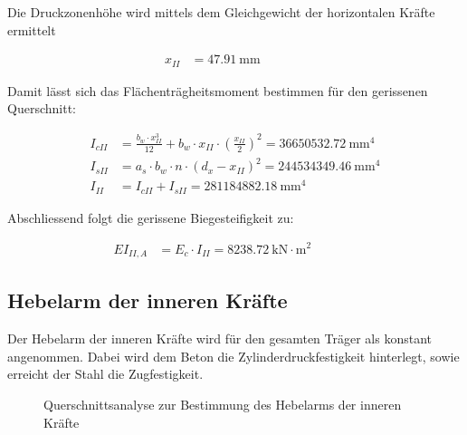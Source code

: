 \documentclass[
  11pt,
  letterpaper,
]{scrreprt}
\begin{document}
Die Druckzonenhöhe wird mittels dem Gleichgewicht der horizontalen
Kräfte ermittelt

\[
\begin{aligned}
x_{II}& = 47.91 \ \mathrm{mm} \quad &  \quad &  
 \end{aligned}
\]

Damit lässt sich das Flächenträgheitsmoment bestimmen für den gerissenen
Querschnitt:

\[
\begin{aligned}
I_{cII}& = \frac{b_{w} \cdot x_{II}^{3}}{12} + b_{w} \cdot x_{II} \cdot \left(\frac{x_{II}}{2}\right)^{2} = 36650532.72 \ \mathrm{mm}^{4} \\ 
I_{sII}& = a_{s} \cdot b_{w} \cdot n \cdot \left(d_{x} - x_{II}\right)^{2} = 244534349.46 \ \mathrm{mm}^{4} \\ 
I_{II}& = I_{cII} + I_{sII} = 281184882.18 \ \mathrm{mm}^{4} \end{aligned}
\]

Abschliessend folgt die gerissene Biegesteifigkeit zu:

\[
\begin{aligned}
EI_{II , A}& = E_{c} \cdot I_{II} = 8238.72 \ \mathrm{kN} \cdot \mathrm{m}^{2} \quad &  \quad &  
 \end{aligned}
\]

\subsection{Hebelarm der inneren
Kräfte}\label{hebelarm-der-inneren-kruxe4fte}

Der Hebelarm der inneren Kräfte wird für den gesamten Träger als
konstant angenommen. Dabei wird dem Beton die Zylinderdruckfestigkeit
hinterlegt, sowie erreicht der Stahl die Zugfestigkeit.

\begin{figure}[H]


\caption{\label{fig-jag_hebelarm_A}Querschnittsanalyse zur Bestimmung
des Hebelarms der inneren Kräfte}

\end{figure}%
\end{document}

